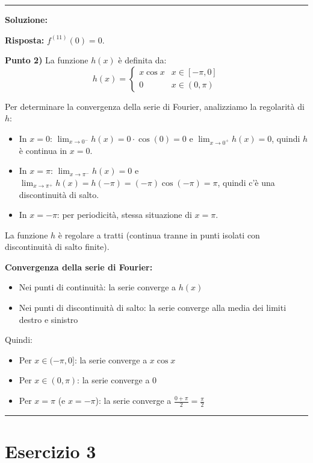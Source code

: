 \documentclass[12pt, a4paper]{article}
\newenvironment{solution}
{\par\noindent\rule{\textwidth}{0.4pt}\par\textbf{Soluzione:}\medskip\par}
{\par\rule{\textwidth}{0.4pt}\par\bigskip}
\begin{document}
\begin{solution}
\textbf{Risposta:} $f^{(11)}(0) = 0$.

\vspace{0.5cm}

\textbf{Punto 2)} La funzione $h(x)$ è definita da:
\[
h(x) = \begin{cases} x \cos x & x \in [-\pi,0] \\ 0 & x \in (0,\pi) \end{cases}
\]

Per determinare la convergenza della serie di Fourier, analizziamo la regolarità di $h$:

\begin{itemize}
    \item In $x = 0$: $\lim_{x \to 0^-} h(x) = 0 \cdot \cos(0) = 0$ e $\lim_{x \to 0^+} h(x) = 0$, quindi $h$ è continua in $x = 0$.
    \item In $x = \pi$: $\lim_{x \to \pi^-} h(x) = 0$ e $\lim_{x \to \pi^+} h(x) = h(-\pi) = (-\pi)\cos(-\pi) = \pi$, quindi c'è una discontinuità di salto.
    \item In $x = -\pi$: per periodicità, stessa situazione di $x = \pi$.
\end{itemize}

La funzione $h$ è regolare a tratti (continua tranne in punti isolati con discontinuità di salto finite).

\textbf{Convergenza della serie di Fourier:}
\begin{itemize}
    \item Nei punti di continuità: la serie converge a $h(x)$
    \item Nei punti di discontinuità di salto: la serie converge alla media dei limiti destro e sinistro
\end{itemize}

Quindi:
\begin{itemize}
    \item Per $x \in (-\pi, 0]$: la serie converge a $x\cos x$
    \item Per $x \in (0, \pi)$: la serie converge a $0$
    \item Per $x = \pi$ (e $x = -\pi$): la serie converge a $\frac{0 + \pi}{2} = \frac{\pi}{2}$
\end{itemize}
\end{solution}

\newpage

\section*{Esercizio 3}
\end{document}
